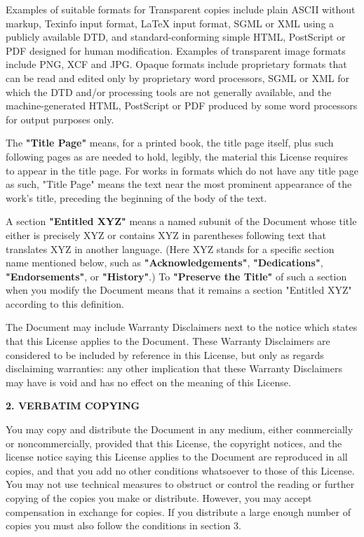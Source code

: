 Examples of suitable formats for Transparent copies include plain
ASCII without markup, Texinfo input format, LaTeX input format, SGML
or XML using a publicly available DTD, and standard-conforming simple
HTML, PostScript or PDF designed for human modification.  Examples of
transparent image formats include PNG, XCF and JPG.  Opaque formats
include proprietary formats that can be read and edited only by
proprietary word processors, SGML or XML for which the DTD and/or
processing tools are not generally available, and the
machine-generated HTML, PostScript or PDF produced by some word
processors for output purposes only.

The \textbf{"Title Page"} means, for a printed book, the title page itself,
plus such following pages as are needed to hold, legibly, the material
this License requires to appear in the title page.  For works in
formats which do not have any title page as such, "Title Page" means
the text near the most prominent appearance of the work's title,
preceding the beginning of the body of the text.

A section \textbf{"Entitled XYZ"} means a named subunit of the Document whose
title either is precisely XYZ or contains XYZ in parentheses following
text that translates XYZ in another language.  (Here XYZ stands for a
specific section name mentioned below, such as \textbf{"Acknowledgements"},
\textbf{"Dedications"}, \textbf{"Endorsements"}, or \textbf{"History"}.)  
To \textbf{"Preserve the Title"}
of such a section when you modify the Document means that it remains a
section "Entitled XYZ" according to this definition.

The Document may include Warranty Disclaimers next to the notice which
states that this License applies to the Document.  These Warranty
Disclaimers are considered to be included by reference in this
License, but only as regards disclaiming warranties: any other
implication that these Warranty Disclaimers may have is void and has
no effect on the meaning of this License.


\begin{center}
{\Large\bf 2. VERBATIM COPYING}
\end{center}

You may copy and distribute the Document in any medium, either
commercially or noncommercially, provided that this License, the
copyright notices, and the license notice saying this License applies
to the Document are reproduced in all copies, and that you add no other
conditions whatsoever to those of this License.  You may not use
technical measures to obstruct or control the reading or further
copying of the copies you make or distribute.  However, you may accept
compensation in exchange for copies.  If you distribute a large enough
number of copies you must also follow the conditions in section 3.

